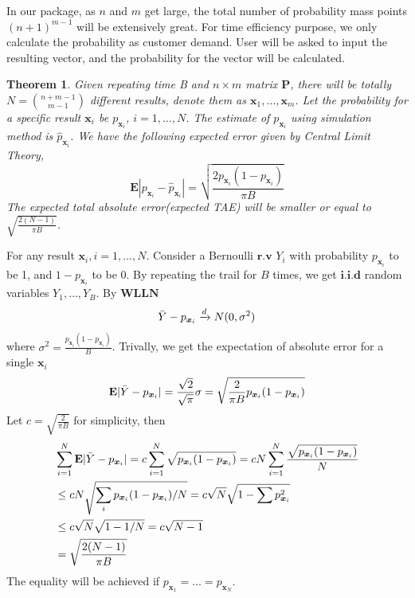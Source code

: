 \documentclass[12pt]{article}
\newcommand{\EE}{\mathbf{E}}
\newtheorem{thm}{Theorem}
\begin{document}
In our package, as $n$ and $m$ get large, the total number of probability mass points $(n+1)^{m-1}$ will be extensively great. For time efficiency purpose, we only calculate the probability as customer demand. User will be asked to input the resulting vector, and the probability for the vector will be calculated.




\begin{thm}
Given repeating time \mbox{B} and $n \times m$ matrix $\boldsymbol{P}$, there will be totally  $N=\binom{n+m-1}{m-1}$ different results, denote them as  $\boldsymbol{x}_1,\dots,\boldsymbol{x}_m$. Let the probability for a specific result $\boldsymbol{x}_{i}$ be $p_{\boldsymbol{x}_{i}}$, $i=1,\dots,N$. The estimate of  $p_{\boldsymbol{x}_{i}}$ using simulation method is $\hat{p}_{\boldsymbol{x}_i}$. We have the following expected error given by Central Limit Theory,
\begin{equation*}
    \EE|p_{\boldsymbol{x}_i} - \hat{p}_{\boldsymbol{x}_i}| =  \sqrt{\frac{2 p_{\boldsymbol{x}_i}(1-p_{\boldsymbol{x}_i})}{\pi B}}
\end{equation*}
The expected total absolute error(expected \mbox{TAE}) will be smaller or equal to 
$\sqrt{\frac{2(N-1)}{\pi B}}$.
\end{thm}
For any result $\boldsymbol{x}_i,i=1,\dots,N$. Consider a Bernoulli $\textbf{r.v}$ $Y_i$ with probability $p_{\boldsymbol{x}_i}$ to be 1, and $1-p_{\boldsymbol{x}_i}$ to be 0. By repeating the trail for $B$ times, we get $\textbf{i.i.d}$ random variables $Y_1,\dots,Y_{B}$. By $\textbf{WLLN}$
\begin{equation*}
    \Bar{Y}-p_{\boldsymbol{x}_i} \xrightarrow{d} N(0,\sigma^2)
\end{equation*}
where $\sigma^2 = \frac{p_{\boldsymbol{x}_i}(1-p_{\boldsymbol{x}_i})}{B}$. Trivally, we get the expectation of absolute error for a single $\boldsymbol{x}_i$
\begin{equation*}
    \EE |\Bar{Y}-p_{\boldsymbol{x}_i}| = \frac{\sqrt{2}}{\sqrt{\pi}}\sigma = \sqrt{\frac{2}{\pi B}p_{\boldsymbol{x}_i}(1-p_{\boldsymbol{x}_i})}
\end{equation*}
Let $c = \sqrt{\frac{2}{\pi B}}$ for simplicity, then
\begin{align*}
    & \sum_{i=1}^{N}\EE |\Bar{Y}-p_{\boldsymbol{x}_i}| = c \sum_{i=1}^{N} \sqrt{p_{\boldsymbol{x}_i}(1-p_{\boldsymbol{x}_i})}  = c N \sum_{i=1}^{N}\frac{\sqrt{p_{\boldsymbol{x}_i}(1-p_{\boldsymbol{x}_i})}}{N} \\
    & \leq c N \sqrt{\sum_{i}p_{\boldsymbol{x}_i}(1-p_{\boldsymbol{x}_i})/N} = c \sqrt{N} \sqrt{1-\sum p_{\boldsymbol{x}_{i}}^2}\\ &\leq c \sqrt{N} \sqrt{1-1/N} = c\sqrt{N-1}\\
    & = \sqrt{\frac{2(N-1)}{\pi B}}
\end{align*}
The equality will be achieved if $p_{\boldsymbol{x}_1} = \dots = p_{\boldsymbol{x}_N}$. 
\end{document}
